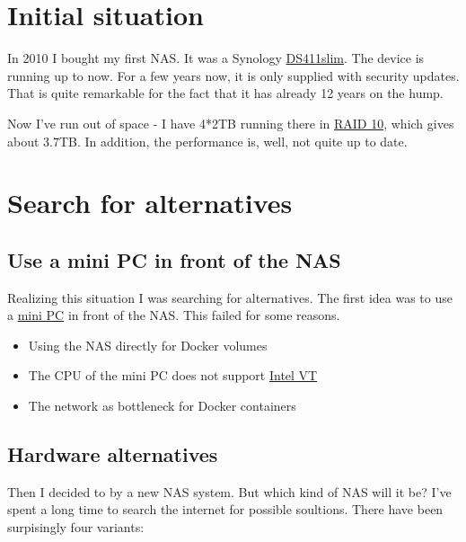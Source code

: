 \section{Initial situation}

In 2010 I bought my first \gls{NAS}. It was a \gls{Synology}
\href{https://global.download.synology.com/download/Document/Hardware/DataSheet/DiskStation/11-year/DS411slim/ger/Synology_DS411slim_Data_Sheet_ger.pdf}{DS411slim}.
The device is running up to now. For a few years now, it is only supplied with
security updates. That is quite remarkable for the fact that it has already 12
years on the hump.
\bigbreak

Now I've run out of space - I have 4*2TB running there in \href{https://en.wikipedia.org/wiki/RAID}{RAID 10},
which gives about 3.7TB. In addition, the performance is, well, not quite up
to date.

\section{Search for alternatives}

\subsection{Use a mini PC in front of the \gls{NAS}}

Realizing this situation I was searching for alternatives. The first idea was
to use a \href{https://www.zotac.com/at/product/mini_pcs/id41-plus}{mini PC} in
front of the \gls{NAS}. This failed for some reasons.

\begin{itemize}
    \item Using the \gls{NAS} directly for \gls{Docker} volumes
    \item The CPU of the mini PC does not support \href{https://en.wikipedia.org/wiki/X86_virtualization}{Intel VT}
    \item The network as bottleneck for \gls{Docker} containers
\end{itemize}

\subsection{Hardware alternatives}

Then I decided to by a new \gls{NAS} system. But which kind of \gls{NAS} will
it be? I've spent a long time to search the internet for possible soultions.
There have been surpisingly four variants:


